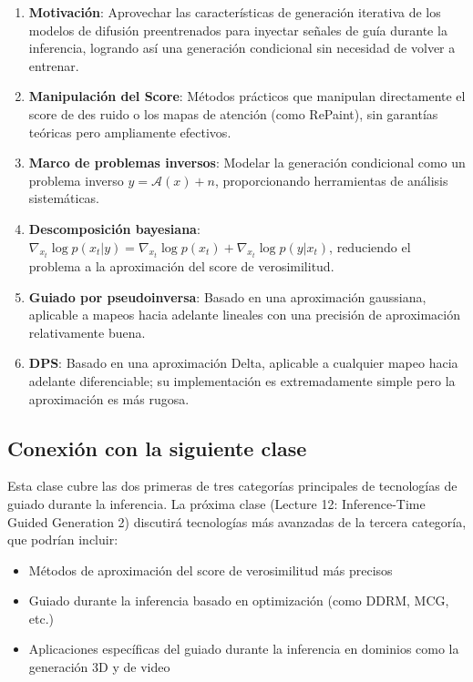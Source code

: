 \documentclass[a4paper]{article}
\begin{document}
\begin{enumerate}
    \item \textbf{Motivación}: Aprovechar las características de generación iterativa de los modelos de difusión preentrenados para inyectar señales de guía durante la inferencia, logrando así una generación condicional sin necesidad de volver a entrenar.
    \item \textbf{Manipulación del Score}: Métodos prácticos que manipulan directamente el score de des ruido o los mapas de atención (como RePaint), sin garantías teóricas pero ampliamente efectivos.
    \item \textbf{Marco de problemas inversos}: Modelar la generación condicional como un problema inverso $y = \mathcal{A}(x) + n$, proporcionando herramientas de análisis sistemáticas.
    \item \textbf{Descomposición bayesiana}: $\nabla_{x_t} \log p(x_t|y) = \nabla_{x_t} \log p(x_t) + \nabla_{x_t} \log p(y|x_t)$, reduciendo el problema a la aproximación del score de verosimilitud.
    \item \textbf{Guiado por pseudoinversa}: Basado en una aproximación gaussiana, aplicable a mapeos hacia adelante lineales con una precisión de aproximación relativamente buena.
    \item \textbf{DPS}: Basado en una aproximación Delta, aplicable a cualquier mapeo hacia adelante diferenciable; su implementación es extremadamente simple pero la aproximación es más rugosa.
\end{enumerate}

\subsection{Conexión con la siguiente clase}

Esta clase cubre las dos primeras de tres categorías principales de tecnologías de guiado durante la inferencia. La próxima clase (Lecture 12: Inference-Time Guided Generation 2) discutirá tecnologías más avanzadas de la tercera categoría, que podrían incluir:
\begin{itemize}
    \item Métodos de aproximación del score de verosimilitud más precisos
    \item Guiado durante la inferencia basado en optimización (como DDRM, MCG, etc.)
    \item Aplicaciones específicas del guiado durante la inferencia en dominios como la generación 3D y de video
\end{itemize}
\end{document}
